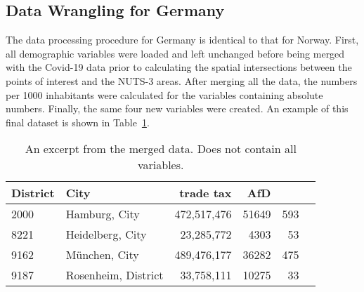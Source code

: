 \subsection*{Data Wrangling for Germany}
The data processing procedure for Germany is identical to that for Norway. First, all demographic variables were loaded and left unchanged before being merged with the Covid-19 data prior to calculating the spatial intersections between the points of interest and the NUTS-3 areas. After merging all the data, the numbers per 1000 inhabitants were calculated for the variables containing absolute numbers. Finally, the same four new variables were created. An example of this final dataset is shown in Table~\ref{finalGermany}.
\begin{table}[H] 
\caption{An excerpt from the merged data. Does not contain all variables.\label{finalGermany}}
\begin{tabular}{l l r r r r}
\toprule
\textbf{District}	& \textbf{City}	& \textbf{trade tax}& \textbf{AfD}\\
\midrule
2000 & Hamburg, City & 472,517,476 & 51649 & 593\\
8221 & Heidelberg, City & 23,285,772 & 4303 & 53\\
9162 & München, City &  489,476,177 &  36282 & 475\\
9187 & Rosenheim, District & 33,758,111 & 10275 & 33\\
\bottomrule
\end{tabular}
\end{table}